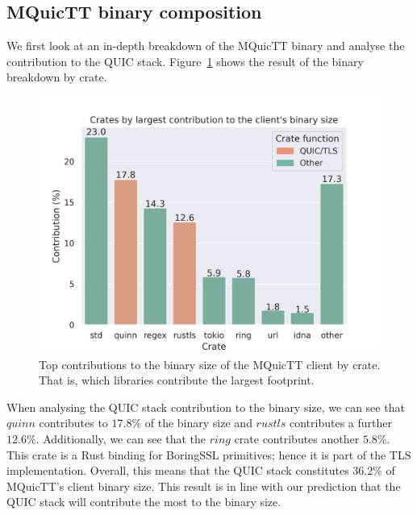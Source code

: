 \subsection{MQuicTT binary composition} \label{sec:binary_sizes}

We first look at an in-depth breakdown of the MQuicTT binary and analyse the contribution to the QUIC stack.
Figure~\ref{fig:mquictt_client_bin} shows the result of the binary breakdown by crate.

\begin{figure}[ht]
    \centering
    \includegraphics[width=1\linewidth]{images/mquictt_binary_client.png}
    \caption{Top contributions to the binary size of the MQuicTT client by crate. That is, which libraries contribute the largest footprint.}
    \label{fig:mquictt_client_bin}
\end{figure}

When analysing the QUIC stack contribution to the binary size, we can see that $quinn$ contributes to $17.8\%$ of the binary size and $rustls$ contributes a further $12.6\%$.
Additionally, we can see that the $ring$ crate contributes another $5.8\%$.
This crate is a Rust binding for BoringSSL primitives; hence it is part of the TLS implementation.
Overall, this means that the QUIC stack constitutes $36.2\%$ of MQuicTT's client binary size.
This result is in line with our prediction that the QUIC stack will contribute the most to the binary size.

